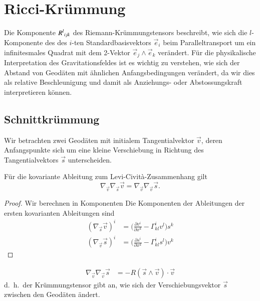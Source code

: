 %
%
\section{Ricci-Krümmung
\label{buch:kruemmung:section:ricci}}

Die Komponente $R^l\mathstrut_{ijk}$  des Riemann-Krümmungstensors
beschreibt, wie sich die $l$-Komponente des des $i$-ten 
Standardbasisvektors $\vec{e}_i$ beim Paralleltransport um
ein infinitesmales Quadrat mit dem 2-Vektor $\vec{e}_j\wedge \vec{e}_k$
verändert.
Für die physikalische Interpretation des Gravitationsfeldes ist
es wichtig zu verstehen, wie sich der Abstand von Geodäten mit
ähnlichen Anfangsbedingungen verändert, da wir dies als relative
Beschleunigung und damit als Anziehungs- oder Abstossungskraft 
interpretieren können.

%
%
\subsection{Schnittkrümmung}
Wir betrachten zwei Geodäten mit initialem Tangentialvektor
$\vec{v}$, deren Anfangspunkte sich um eine kleine Verschiebung
in Richtung des Tangentialvektors $\vec{s}$ unterscheiden.

\begin{lemma}
Für die kovariante Ableitung zum Levi-Cività-Zusammenhang gilt
\[
\nabla_{\vec{v}}\nabla_{\vec{s}}\vec{v}
=
\nabla_{\vec{v}}\nabla_{\vec{v}}\vec{s}.
\]
\end{lemma}

\begin{proof}
Wir berechnen in Komponenten
Die Komponenten der Ableitungen der ersten kovarianten Ableitungen
sind
\begin{align*}
(\nabla_{\vec{s}}\vec{v})^i
&=
\biggl(
\frac{\partial v^i}{\partial x^k}
-
\Gamma^i_{kl} v^l
\biggr)
s^k
\\
(\nabla_{\vec{v}}\vec{s})^i
&=
\biggl(
\frac{\partial s^i}{\partial x^k}
-
\Gamma^i_{kl} s^l
\biggr)
v^k
\end{align*}

\end{proof}

\begin{align*}
\nabla_{\vec{v}}\nabla_{\vec{v}}\vec{s}
&=
-R(\vec{s}\wedge\vec{v})\cdot \vec{v}
\end{align*}
d.~h.~der Krümmungstensor gibt an, wie sich der
Verschiebungsvektor $\vec{s}$ zwischen den Geodäten ändert.

